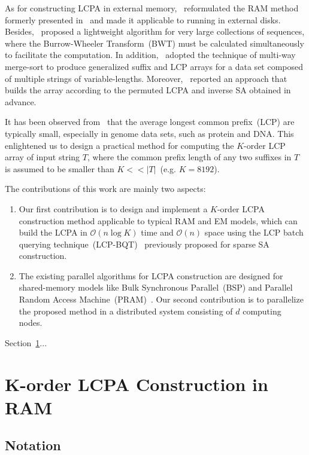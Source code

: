 \documentclass{llncs}
\begin{document}
As for constructing {LCPA} in external memory,~\cite{Bingmann-Code12} reformulated the {RAM} method formerly presented in~\cite{Fischer11} and made it applicable to running in external disks. Besides,~\cite{Markus2012} proposed a lightweight algorithm for very large collections of sequences, where the Burrow-Wheeler Transform~(BWT) must be calculated simultaneously to facilitate the computation. In addition,~\cite{Felipe2013} adopted the technique of multi-way merge-sort to produce generalized suffix and {LCP} arrays for a data set composed of multiple strings of variable-lengths. Moreover,~\cite{Juha2014} reported an approach that builds the array according to the permuted {LCPA} and inverse {SA} obtained in advance.

It has been observed from~\cite{Felipe2013} that the average longest common prefix~({LCP}) are typically small, especially in genome data sets, such as protein and {DNA}. This enlightened us to design a practical method for computing the $K$-order {LCP} array of input string $T$, where the common prefix length of any two suffixes in $T$ is assumed to be smaller than $K<<|T|$~(e.g. $K=8192$).

The contributions of this work are mainly two aspects:
\begin{enumerate}
\item Our first contribution is to design and implement a $K$-order {LCPA} construction method applicable to typical {RAM} and {EM} models, which can build the {LCPA} in $\mathcal{O}(n\log K)$ time and $\mathcal{O}(n)$ space using the {LCP} batch querying technique~({LCP-BQT})~\cite{Philip2013} previously proposed for sparse SA construction.
\item The existing parallel algorithms for {LCPA} construction are designed for shared-memory models like Bulk Synchronous Parallel~({BSP}) and Parallel Random Access Machine~({PRAM})~\cite{Shun2014,Deo2013}. Our second contribution is to parallelize the proposed method in a distributed system consisting of $d$ computing nodes.
\end{enumerate}

Section~\ref{sec:construction_in_ram}...

\section{K-order LCPA Construction in RAM}\label{sec:construction_in_ram}

\subsection{Notation}\label{subsec:basic_notations}
\end{document}
